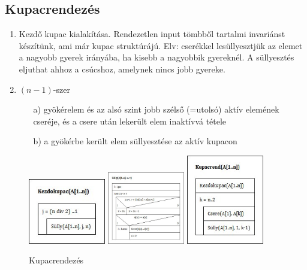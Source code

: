 \documentclass[margin=0px]{article}
\begin{document}
	\subsection{Kupacrendezés}
	
	\begin{enumerate}
		\item Kezdő kupac kialakítása. Rendezetlen input tömbből tartalmi invariánst készítünk, ami már kupac struktúrájú. Elv: cserékkel lesüllyesztjük az elemet a nagyobb gyerek irányába, ha kisebb a nagyobbik gyereknél. A süllyesztés eljuthat ahhoz a csúcshoz, amelynek nincs jobb gyereke.
		\item $(n-1)$-szer
		\begin{itemize}
			\item[a)] gyökérelem és az alsó szint jobb szélső (=utolsó) aktív elemének cseréje, és a csere után lekerült elem inaktívvá tétele
			\item[b)] a gyökérbe került elem süllyesztése az aktív kupacon
		\end{itemize}
	\end{enumerate}	
	\begin{figure}[H]
		\centering
		\includegraphics[width=0.3\textwidth]{img/Kezdokupac.jpg}
		\includegraphics[width=0.3\textwidth]{img/Sully.jpg}
		\includegraphics[width=0.3\textwidth]{img/KupacRend.jpg}
		\caption{Kupacrendezés}
	\end{figure}
	
\end{document}
